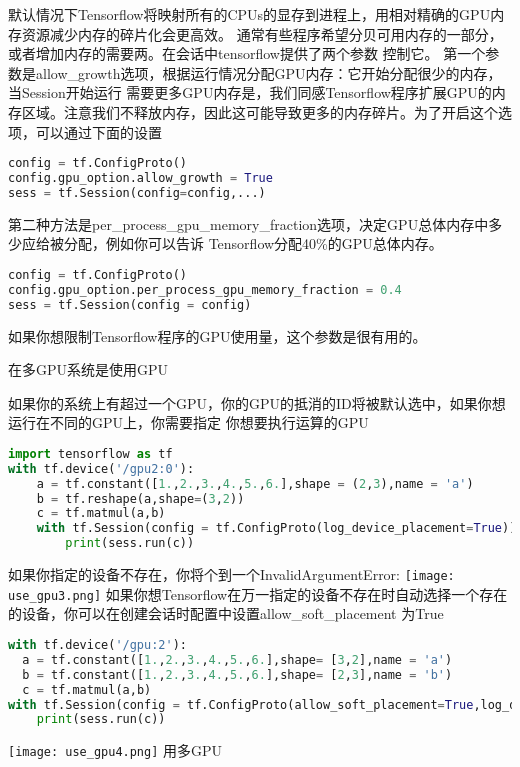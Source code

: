 默认情况下Tensorflow将映射所有的CPUs的显存到进程上，用相对精确的GPU内存资源减少内存的碎片化会更高效。 通常有些程序希望分贝可用内存的一部分，或者增加内存的需要两。在会话中tensorflow提供了两个参数 控制它。 第一个参数是allow\_growth选项，根据运行情况分配GPU内存：它开始分配很少的内存，当Session开始运行 需要更多GPU内存是，我们同感Tensorflow程序扩展GPU的内存区域。注意我们不释放内存，因此这可能导致更多的内存碎片。为了开启这个选项，可以通过下面的设置
\begin{lstlisting}[language=Python]
config = tf.ConfigProto()
config.gpu_option.allow_growth = True
sess = tf.Session(config=config,...)
\end{lstlisting}
第二种方法是per\_process\_gpu\_memory\_fraction选项，决定GPU总体内存中多少应给被分配，例如你可以告诉 Tensorflow分配40\%的GPU总体内存。
\begin{lstlisting}[language=Python]
config = tf.ConfigProto()
config.gpu_option.per_process_gpu_memory_fraction = 0.4
sess = tf.Session(config = config)
\end{lstlisting}
如果你想限制Tensorflow程序的GPU使用量，这个参数是很有用的。

在多GPU系统是使用GPU

如果你的系统上有超过一个GPU，你的GPU的抵消的ID将被默认选中，如果你想运行在不同的GPU上，你需要指定 你想要执行运算的GPU
\begin{lstlisting}[language=Python]
import tensorflow as tf
with tf.device('/gpu2:0'):
    a = tf.constant([1.,2.,3.,4.,5.,6.],shape = (2,3),name = 'a')
    b = tf.reshape(a,shape=(3,2))
    c = tf.matmul(a,b)
    with tf.Session(config = tf.ConfigProto(log_device_placement=True)) as sess:
        print(sess.run(c))
\end{lstlisting}
如果你指定的设备不存在，你将个到一个InvalidArgumentError:\newline
\texttt{[image: use\_gpu3.png]}\newline
如果你想Tensorflow在万一指定的设备不存在时自动选择一个存在的设备，你可以在创建会话时配置中设置allow\_soft\_placement 为True
\begin{lstlisting}[language=Python]
with tf.device('/gpu:2'):
  a = tf.constant([1.,2.,3.,4.,5.,6.],shape= [3,2],name = 'a')
  b = tf.constant([1.,2.,3.,4.,5.,6.],shape= [2,3],name = 'b')
  c = tf.matmul(a,b)
with tf.Session(config = tf.ConfigProto(allow_soft_placement=True,log_device_placement=True)) as sess:
    print(sess.run(c))
\end{lstlisting}
\texttt{[image: use\_gpu4.png]}\newline
用多GPU

